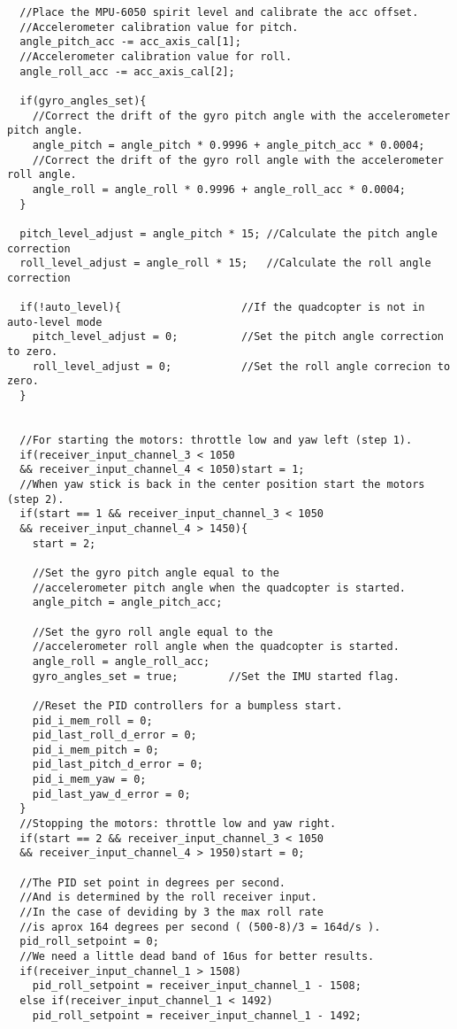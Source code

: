 \begin{lstlisting}
  //Place the MPU-6050 spirit level and calibrate the acc offset.
  //Accelerometer calibration value for pitch. 
  angle_pitch_acc -= acc_axis_cal[1];
  //Accelerometer calibration value for roll.                                       
  angle_roll_acc -= acc_axis_cal[2];                                        
  
  if(gyro_angles_set){
    //Correct the drift of the gyro pitch angle with the accelerometer pitch angle.
    angle_pitch = angle_pitch * 0.9996 + angle_pitch_acc * 0.0004;
    //Correct the drift of the gyro roll angle with the accelerometer roll angle.
    angle_roll = angle_roll * 0.9996 + angle_roll_acc * 0.0004;               
  }

  pitch_level_adjust = angle_pitch * 15; //Calculate the pitch angle correction
  roll_level_adjust = angle_roll * 15;   //Calculate the roll angle correction

  if(!auto_level){                   //If the quadcopter is not in auto-level mode
    pitch_level_adjust = 0;          //Set the pitch angle correction to zero.
    roll_level_adjust = 0;           //Set the roll angle correcion to zero.
  }


  //For starting the motors: throttle low and yaw left (step 1).
  if(receiver_input_channel_3 < 1050 
  && receiver_input_channel_4 < 1050)start = 1;
  //When yaw stick is back in the center position start the motors (step 2).
  if(start == 1 && receiver_input_channel_3 < 1050 
  && receiver_input_channel_4 > 1450){
    start = 2;

    //Set the gyro pitch angle equal to the 
    //accelerometer pitch angle when the quadcopter is started.
    angle_pitch = angle_pitch_acc;  

    //Set the gyro roll angle equal to the 
    //accelerometer roll angle when the quadcopter is started.
    angle_roll = angle_roll_acc;                                            
    gyro_angles_set = true;        //Set the IMU started flag.

    //Reset the PID controllers for a bumpless start.
    pid_i_mem_roll = 0;
    pid_last_roll_d_error = 0;
    pid_i_mem_pitch = 0;
    pid_last_pitch_d_error = 0;
    pid_i_mem_yaw = 0;
    pid_last_yaw_d_error = 0;
  }
  //Stopping the motors: throttle low and yaw right.
  if(start == 2 && receiver_input_channel_3 < 1050 
  && receiver_input_channel_4 > 1950)start = 0;

  //The PID set point in degrees per second. 
  //And is determined by the roll receiver input.
  //In the case of deviding by 3 the max roll rate
  //is aprox 164 degrees per second ( (500-8)/3 = 164d/s ).
  pid_roll_setpoint = 0;
  //We need a little dead band of 16us for better results.
  if(receiver_input_channel_1 > 1508)
    pid_roll_setpoint = receiver_input_channel_1 - 1508;
  else if(receiver_input_channel_1 < 1492)
    pid_roll_setpoint = receiver_input_channel_1 - 1492;


\end{lstlisting}
